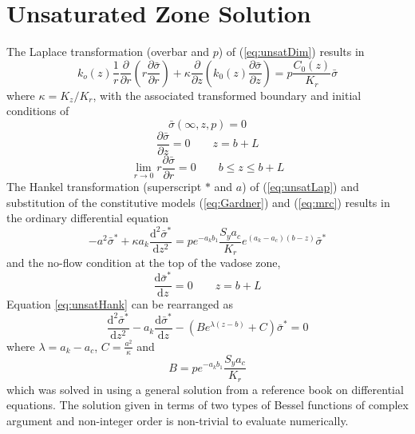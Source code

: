 \documentclass[12pt,letterpaper]{article}
\begin{document}
\section{Unsaturated Zone Solution}
The Laplace transformation (overbar and $p$) of (\ref{eq:unsatDim}) results in
\begin{equation}
  \label{eq:unsatLap}
   k_o(z) \frac{1}{r} \frac{\partial}{\partial r} \left( r\frac{\partial \bar{\sigma}}{\partial r} \right) +\kappa \frac{\partial}{\partial z} \left( k_0(z) \frac{\partial \bar{\sigma}}{\partial z}\right) = p \frac{C_0(z)}{K_r}  \bar{\sigma}
\end{equation}
where $\kappa=K_z/K_r$, with the associated transformed boundary and initial conditions of
\begin{equation}\nonumber
 \bar{\sigma}(\infty,z,p) = 0
\end{equation}
\begin{equation}\nonumber
 \frac{\partial \bar{\sigma}}{\partial z}=0 \qquad z=b+L
\end{equation}
 \begin{equation}\nonumber
\lim_{r \rightarrow 0} r \frac{\partial \bar{\sigma}}{\partial r} = 0 \qquad b\le z \le b+L
\end{equation}
The Hankel transformation (superscript $\ast$ and $a$) of (\ref{eq:unsatLap}) and substitution of the constitutive models (\ref{eq:Gardner}) and (\ref{eq:mrc}) results in the ordinary differential equation
\begin{equation}
  \label{eq:unsatHank}
   -a^2 \bar{\sigma}^{\ast} + \kappa a_k \frac{\mathrm{d}^2 \bar{\sigma}^{\ast}}{\mathrm{d} z^2}  = p e^{-a_k b_1} \frac{S_y a_c} {K_r}  e^{\left(a_k -a_c \right)\left( b - z\right)} \bar{\sigma}^{\ast} 
\end{equation}
and the no-flow condition at the top of the vadose zone, 
\begin{equation}\nonumber
 \frac{\mathrm{d}\bar{\sigma}^{\ast}}{\mathrm{d}z}=0 \qquad z=b+L 
\end{equation}
Equation \ref{eq:unsatHank} can be rearranged as
\begin{equation}
  \label{eq:mn-d5}
  \frac{\mathrm{d}^2 \bar{\sigma}^{\ast}}{\mathrm{d}z^2} - a_k \frac{\mathrm{d} \bar{\sigma}^{\ast}}{\mathrm{d}z} - \left( B e^{\lambda (z-b)} + C\right) \bar{\sigma}^{\ast}=0
\end{equation}
where $\lambda = a_k-a_c$, $C=\frac{a^2}{\kappa}$ and
\begin{equation}\nonumber
B = p e^{-a_k b_1} \frac{S_y a_c} {K_r} 
\end{equation}
which was solved in \cite{mishra10} using a general solution from a
reference book on differential equations.  The solution given in terms
of two types of Bessel functions of complex argument and non-integer
order is non-trivial to evaluate numerically. 
\end{document}

